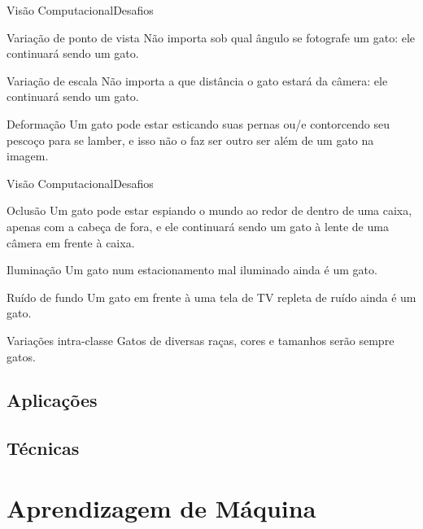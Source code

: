 \documentclass{beamer}
\begin{document}
    \begin{frame}{Visão Computacional}{Desafios}
        
        \begin{alertblock}{Variação de ponto de vista}
            Não importa sob qual ângulo se fotografe um gato:
            ele continuará sendo um gato.
        \end{alertblock}

        \begin{alertblock}{Variação de escala}
            Não importa a que distância o gato estará da câmera:
            ele continuará sendo um gato.
        \end{alertblock}

        \begin{alertblock}{Deformação}
            Um gato pode estar esticando suas pernas ou/e contorcendo
            seu pescoço para se lamber, e isso não o faz ser
            outro ser além de um gato na imagem.
        \end{alertblock}

    \end{frame}

    \begin{frame}{Visão Computacional}{Desafios}

        \begin{alertblock}{Oclusão}
            Um gato pode estar espiando o mundo ao redor de dentro de uma
            caixa, apenas com a cabeça de fora, e ele continuará sendo um gato à lente de uma câmera
            em frente à caixa.
        \end{alertblock}

        \begin{alertblock}{Iluminação}
            Um gato num estacionamento mal iluminado ainda é um gato.
        \end{alertblock}

        \begin{alertblock}{Ruído de fundo}
            Um gato em frente à uma tela de TV repleta de ruído
            ainda é um gato.
        \end{alertblock}

        \begin{alertblock}{Variações intra-classe}
            Gatos de diversas raças, cores e tamanhos serão
            sempre gatos.
        \end{alertblock}
    \end{frame}

    \subsection{Aplicações}
    

    \subsection{Técnicas}

\section{Aprendizagem de Máquina}
\end{document}
